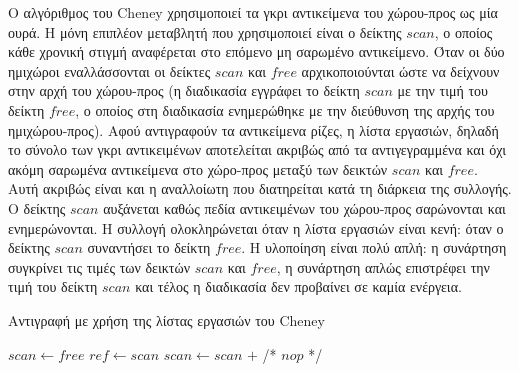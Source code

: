 \begin{greek}
Ο αλγόριθμος του Cheney \cite{DBLP:journals/cacm/Cheney70} χρησιμοποιεί
τα γκρι αντικείμενα του χώρου-προς ως μία ουρά. Η μόνη επιπλέον
μεταβλητή που χρησιμοποιεί είναι ο δείκτης $scan$, ο οποίος κάθε
χρονική στιγμή αναφέρεται στο επόμενο μη σαρωμένο αντικείμενο.
Όταν οι δύο ημιχώροι εναλλάσσονται οι δείκτες $scan$ και $free$
αρχικοποιούνται ώστε να δείχνουν στην αρχή του χώρου-προς (η
διαδικασία \textenglish{} εγγράφει το δείκτη $scan$ με
την τιμή του δείκτη $free$, ο οποίος στη διαδικασία \textenglish{}
ενημερώθηκε με την διεύθυνση της αρχής του ημιχώρου-προς).
Αφού αντιγραφούν τα αντικείμενα ρίζες, η λίστα εργασιών, δηλαδή
το σύνολο των γκρι αντικειμένων αποτελείται ακριβώς από τα
αντιγεγραμμένα και όχι ακόμη σαρωμένα αντικείμενα στο χώρο-προς
μεταξύ των δεικτών $scan$ και $free$. Αυτή ακριβώς είναι και η
αναλλοίωτη που διατηρείται κατά τη διάρκεια της συλλογής. Ο
δείκτης $scan$ αυξάνεται καθώς πεδία αντικειμένων του χώρου-προς
σαρώνονται και ενημερώνονται. Η συλλογή ολοκληρώνεται όταν η
λίστα εργασιών είναι κενή: όταν ο δείκτης $scan$ συναντήσει το
δείκτη $free$. Η υλοποίηση είναι πολύ απλή: η συνάρτηση \textenglish{}
συγκρίνει τις τιμές των δεικτών $scan$ και $free$, η συνάρτηση
\textenglish{} απλώς επιστρέφει την τιμή του δείκτη $scan$
και τέλος η διαδικασία \textenglish{} δεν προβαίνει σε καμία
ενέργεια.

\begin{algorithm}
  \caption{Αντιγραφή με χρήση της λίστας εργασιών του Cheney}
  \label{alg:c_3}
  \begin{algorithmic}[1]
      \State $scan \gets free$
    \EndProcedure
    \Statex
      \State {}
    \EndFunction
    \Statex
      \State $ref \gets scan$
      \State $scan \gets scan$ $+$ 
      \State {}
    \EndFunction
    \Statex
      \State /* $nop$ */
    \EndProcedure
  \end{algorithmic}
\end{algorithm}


\end{greek}
